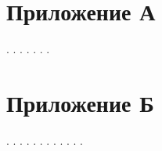 \appendix
\section*{Приложение А}

\newpage
.
\newpage
.
\newpage
.
\newpage
.
\newpage
.
\newpage
.
\newpage
.
\newpage
\section*{Приложение Б}

\newpage
.
\newpage
.
\newpage
.
\newpage
.
\newpage
.
\newpage
.
\newpage
.
\newpage
.
\newpage
.
\newpage
.
\newpage
.
\newpage
.